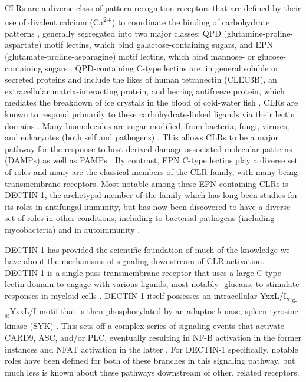 CLRs are a diverse class of pattern recognition receptors that are defined by their use of divalent calcium (Ca\textsuperscript{2+}) to coordinate the binding of carbohydrate patterns \citep{Hosoi1998}, generally segregated into two major classes: QPD (glutamine-proline-aspartate) motif lectins, which bind galactose-containing sugars, and EPN (glutamate-proline-asparagine) motif lectins, which bind mannose- or glucose-containing sugars \citep{Furukawa2013, Alenton2017, Zelensky2005, Holtet1997}. QPD-containing C-type lectins are, in general soluble or secreted proteins and include the likes of human tetranectin (CLEC3B), an extracellular matrix-interacting protein, and herring antifreeze protein, which mediates the breakdown of ice crystals in the blood of cold-water fish \citep{Liu2007, Ewart1998, Ewart1993}. CLRs are known to respond primarily to these carbohydrate-linked ligands via their lectin domains \citep{McGreal2005}. Many biomolecules are sugar-modified, from bacteria, fungi, viruses, and eukaryotes (both self and pathogens) \citep{Rudd2001, Ohtsubo2006}. This allows CLRs to be a major pathway for the response to host-derived \underline{d}amage-\underline{a}ssociated \underline{m}olecular \underline{p}atterns (DAMPs) as well as PAMPs \citep{GarciaVallejo2009}. By contrast, EPN C-type lectins play a diverse set of roles and many are the classical members of the CLR family, with many being transmembrane receptors. Most notable among these EPN-containing CLRs is DECTIN-1, the archetypal member of the family which has long been studies for its roles in antifungal immunity, but has now been discovered to have a diverse set of roles in other conditions, including to bacterial pathogens (including mycobacteria) and in autoimmunity \citep{Brown2002, Brown2003, Brown2006, Reid2009, Drummond2011, Schorey2008, Yadav2006, Wagener2018, Deerhake2021}. 

DECTIN-1 has provided the scientific foundation of much of the knowledge we have about the mechanisms of signaling downstream of CLR activation. DECTIN-1 is a single-pass transmembrane receptor that uses a large C-type lectin domain to engage with various ligands, most notably \textbeta-glucans, to stimulate responses in myeloid cells \citep{Brown2007}. DECTIN-1 itself possesses an intracellular YxxL/I\textsubscript{x\textsubscript{(6-8)}}YxxL/I motif that is then phosphorylated by an adaptor kinase, spleen tyrosine kinase (SYK) \citep{Getahun2015, Kerrigan2010}. This sets off a complex series of signaling events that activate CARD9, ASC, and/or PLC, eventually resulting in NF-\textkappa B activation in the former instances and NFAT activation in the latter \citep{Geijtenbeek2009, Drummond2013}. For DECTIN-1 specifically, notable roles have been defined for both of these branches in this signaling pathway, but much less is known about these pathways downstream of other, related receptors.

